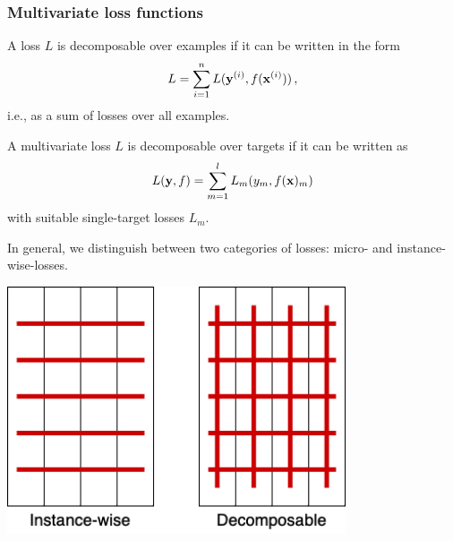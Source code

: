 \documentclass[11pt,compress,t,notes=noshow, xcolor=table]{beamer}
\begin{document}
\begin{frame}
	\frametitle{Multivariate loss functions}
	\small
	\begin{itemize}
%		
%
		\item A loss $L$ is decomposable over examples if it can be written in the form
		$$
		L = \sum_{i=1}^n L(\mathbf{y}^{(i)}, f(\mathbf{x}^{(i)})) 
		\, ,
		$$
		i.e., as a sum of losses over all examples. 
		
		
		\item A multivariate loss $L$ is decomposable over targets if it can be written as
		$$
		L(\mathbf{y}, f) = \sum_{m=1}^l L_m(y_m, f(\mathbf{x})_m) 
		$$
		with suitable single-target losses $L_m$. 
		
%		

		\begin{minipage}{0.45\textwidth}
%			
			\item  In general, we distinguish between two categories of losses: micro- and instance-wise-losses. 
%			
		\end{minipage}
%	
		\begin{minipage}{0.45\textwidth}
			\begin{center}
				\includegraphics[width=0.75\textwidth]{figure/fmeasure}
			\end{center}
		\end{minipage}
%		
	\end{itemize}
%
\end{frame}
\end{document}
